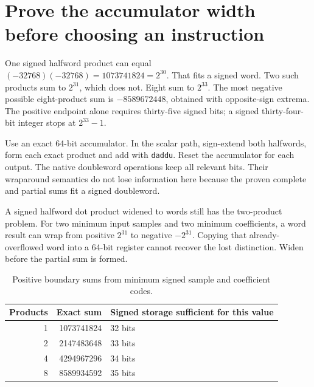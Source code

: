 \section{Prove the accumulator width before choosing an instruction}
One signed halfword product can equal
\((-32768)(-32768)=1073741824=2^{30}\). That fits a signed word. Two such products
sum to \(2^{31}\), which does not. Eight sum to \(2^{33}\). The most negative
possible eight-product sum is \(-8589672448\), obtained with opposite-sign extrema.
The positive endpoint alone requires thirty-five signed bits; a signed thirty-four-bit
integer stops at \(2^{33}-1\).

Use an exact 64-bit accumulator. In the scalar path, sign-extend both halfwords,
form each exact product and add with \texttt{daddu}. Reset the accumulator for each
output. The native doubleword operations keep all relevant bits. Their wraparound
semantics do not lose information here because the proven complete and partial sums
fit a signed doubleword.

A signed halfword dot product widened to words still has the two-product problem.
For two minimum input samples and two minimum coefficients, a word result can wrap
from positive \(2^{31}\) to negative \(-2^{31}\). Copying that already-overflowed
word into a 64-bit register cannot recover the lost distinction. Widen before the
partial sum is formed.

\begin{table}[htbp]
  \centering
  \caption{Positive boundary sums from minimum signed sample and coefficient codes.}
  \begin{tabular}{rrl}
    \toprule
    Products & Exact sum  & Signed storage sufficient for this value \\
    \midrule
    1        & 1073741824 & 32 bits                                  \\
    2        & 2147483648 & 33 bits                                  \\
    4        & 4294967296 & 34 bits                                  \\
    8        & 8589934592 & 35 bits                                  \\
    \bottomrule
  \end{tabular}
\end{table}
